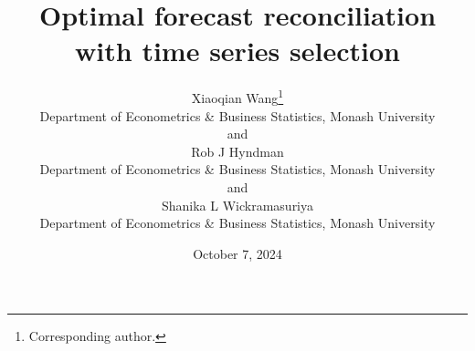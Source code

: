\documentclass[
  11pt]{article}
\theoremstyle{plain}
\theoremstyle{remark}
\begin{document}
\def\spacingset#1{\renewcommand{\baselinestretch}%
{#1}\small\normalsize} \spacingset{1}

\renewcommand*{\arraystretch}{0.5} %


\date{October 7, 2024}
\title{\bf Optimal forecast reconciliation with time series selection}
\author{
Xiaoqian Wang\thanks{Corresponding author.} \vspace{0.2em}\\
Department of Econometrics \& Business Statistics, Monash
University \vspace{0.2em}\\
and \vspace{0.2em}\\Rob J Hyndman \vspace{0.2em}\\
Department of Econometrics \& Business Statistics, Monash
University \vspace{0.2em}\\
and \vspace{0.2em}\\Shanika L Wickramasuriya \vspace{0.2em}\\
Department of Econometrics \& Business Statistics, Monash
University \vspace{0.2em}\\
}
\maketitle
\end{document}
